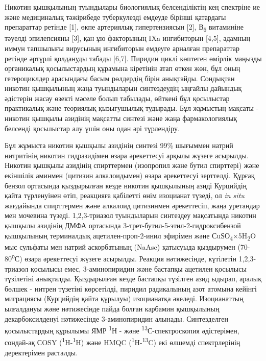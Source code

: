 Никотин қышқылының туындылары биологиялық белсенділіктің кең спектріне
ие және медициналық тәжірибеде туберкулезді емдеуде бірінші қатардағы
препараттар ретінде {[}1{]}, өкпе артериялық гипертензиясын {[}2{]},
В\textsubscript{6} витаминіне тәуелді эпилепсияны {[}3{]}, қан ұю
факторының IXa ингибиторын {[}4,5{]}, адамның иммун тапшылығы вирусының
ингибиторын емдеуге арналған препараттар ретінде әртүрлі қолдануды
табады {[}6,7{]}. Пиридин циклі көптеген өмірлік маңызды органикалық
қосылыстардың құрамына кіретінін атап өткен жөн, бұл оның гетероциклдер
арасындағы басым рөлдердің бірін анықтайды. Сондықтан никотин қышқылының
жаңа туындыларын синтездеудің ыңғайлы дайындық әдістерін жасау өзекті
мәселе болып табылады, өйткені бұл қосылыстар практикалық және теориялық
қызығушылық тудырады. Бұл жұмыстың мақсаты - никотин қышқылы азидінің
мақсатты синтезі және жаңа фармакологиялық белсенді қосылыстар алу үшін
оны одан әрі түрлендіру.

Бұл жұмыста никотин қышқылы азидінің синтезі 99\% шығыммен натрий
нитритінің никотин гидразидімен өзара әрекеттесуі арқылы жүзеге
асырылды. Никотин қышқылы азидінің спирттермен (изопропил және бутил
спирттері) және екіншілік аминмен (цитизин алкалоидымен) өзара
әрекеттесуі зерттелді. Құрғақ бензол ортасында қыздырылған кезде никотин
қышқылының азиді Курцийдің қайта түрленуінен өтіп, реакцияға қабілетті
өнім изоцианат түзеді, ол \emph{in situ} жағдайында спирттермен және
алкалоид цитизинмен әрекеттесіп, жаңа уретандар мен мочевина түзеді.
1,2,3-триазол туындыларын синтездеу мақсатында никотин қышқылы азидінің
ДМФА ортасында 3-трет-бутил-5-этил-2-гидроксибензой қышқылының
терминалдық ацетилен-проп-2-инил эфирімен және
СuЅО\textsubscript{4}×5H\textsubscript{2}O мыс сульфаты мен натрий
аскорбатының (NaAsc) қатысуыда қыздырумен (70-80\textsuperscript{о}С)
өзара әрекеттесуі жүзеге асырылды. Реакция нәтижесінде, күтілетін
1,2,3-триазол қосылысы емес, 3-аминопиридин және бастапқы ацетилен
қосылысы түзілетіні анықталды. Қыздырылған кезде бастапқы түзілген азид
ыдырап, аралық бөлшек - нитрен түзетіні көрсетілді, пиридил радикалының
азот атомына кейінгі миграциясы (Курцийдің қайта құрылуы) изоцианатқа
әкеледі. Изоцианаттың ылғалдануы және нәтижесінде пайда болған карбамин
қышқылының декарбоксилденуі нәтижесінде 3-аминопиридин алынады.
Синтезделген қосылыстардың құрылымы ЯМР \textsuperscript{1}Н - және
\textsuperscript{13}С-спектроскопия әдістерімен, сондай-ақ СOSY
(\textsuperscript{1}H-\textsuperscript{1}H) және HMQC
(\textsuperscript{1}H-\textsuperscript{13}C) екі өлшемді спектрлерінің
деректерімен расталды.

